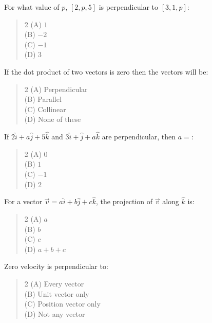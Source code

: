 \documentclass[11pt,a4paper]{article}
\begin{document}
\begin{mcqlist}
\item For what value of $p$, $[2,p,5]$ is perpendicular to $[3,1,p]$:
\begin{quote}\begin{multicols}{2}
\noindent (A) $1$ \\
(B) $-2$ \\
(C) $-1$ \\
(D) $3$
\end{multicols}\end{quote}

\item If the dot product of two vectors is zero then the vectors will be:
\begin{quote}\begin{multicols}{2}
\noindent (A) Perpendicular \\
(B) Parallel \\
(C) Collinear \\
(D) None of these
\end{multicols}\end{quote}

\item If $2\hat{i}+a\hat{j}+5\hat{k}$ and $3\hat{i}+\hat{j}+a\hat{k}$ are perpendicular, then $a=$:
\begin{quote}\begin{multicols}{2}
\noindent (A) $0$ \\
(B) $1$ \\
(C) $-1$ \\
(D) $2$
\end{multicols}\end{quote}

\item For a vector $\vec{v}=a\hat{i}+b\hat{j}+c\hat{k}$, the projection of $\vec{v}$ along $\hat{k}$ is:
\begin{quote}\begin{multicols}{2}
\noindent (A) $a$ \\
(B) $b$ \\
(C) $c$ \\
(D) $a+b+c$
\end{multicols}\end{quote}

\item Zero velocity is perpendicular to:
\begin{quote}\begin{multicols}{2}
\noindent (A) Every vector \\
(B) Unit vector only \\
(C) Position vector only \\
(D) Not any vector
\end{multicols}\end{quote}


\end{mcqlist}
\end{document}
